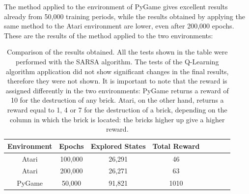 The method applied to the environment of PyGame gives excellent results already from 50,000 training periods, while the results obtained by applying the same method to the Atari environment are lower, even after 200,000 epochs. These are the results of the method applied to the two environments:

\begin{table}[h]
	\centering
	\begin{tabular}{*{8}{c}}
		Environment & Epochs & Explored States & Total Reward \\
		\hline
		Atari & 100,000 & 26,291 & 46 \\
		Atari & 200,000 & 26,271 & 63 \\
		\hline
		PyGame & 50,000 & 91,821 & 1010 \\
	\end{tabular}
	\caption{Comparison of the results obtained. All the tests shown in the table were performed with the SARSA algorithm. The tests of the Q-Learning algorithm application did not show significant changes in the final results, therefore they were not shown. It is important to note that the reward is assigned differently in the two environments: PyGame returns a reward of 10 for the destruction of any brick. Atari, on the other hand, returns a reward equal to 1, 4 or 7 for the destruction of a brick, depending on the column in which the brick is located: the bricks higher up give a higher reward.}
\end{table}

